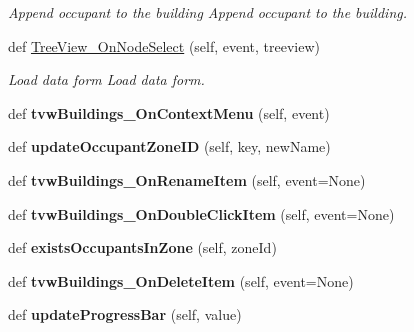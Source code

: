 \begin{DoxyCompactItemize}
\begin{DoxyCompactList}\small\item\em Append occupant to the building Append occupant to the building. \end{DoxyCompactList}\item 
def \hyperlink{class_no_m_a_s_s___g_u_i_1_1_app_a7208f3b1f5b7729d83c63f0eb6f97a8a}{Tree\+View\+\_\+\+On\+Node\+Select} (self, event, treeview)
\begin{DoxyCompactList}\small\item\em Load data form Load data form. \end{DoxyCompactList}\item 
\mbox{\label{class_no_m_a_s_s___g_u_i_1_1_app_aba0b136ce86ac92c6d0b799aba96b33c}} 
def {\bfseries tvw\+Buildings\+\_\+\+On\+Context\+Menu} (self, event)
\item 
\mbox{\label{class_no_m_a_s_s___g_u_i_1_1_app_a77496544a1d16515fa440f237110f52c}} 
def {\bfseries update\+Occupant\+Zone\+ID} (self, key, new\+Name)
\item 
\mbox{\label{class_no_m_a_s_s___g_u_i_1_1_app_a9a2953f5b7ba5bec684640a9b22be158}} 
def {\bfseries tvw\+Buildings\+\_\+\+On\+Rename\+Item} (self, event=None)
\item 
\mbox{\label{class_no_m_a_s_s___g_u_i_1_1_app_ab20860aefaad3146737f66ea2c27723b}} 
def {\bfseries tvw\+Buildings\+\_\+\+On\+Double\+Click\+Item} (self, event=None)
\item 
\mbox{\label{class_no_m_a_s_s___g_u_i_1_1_app_ad17bb4938e69d3f03282ddcddba19cd9}} 
def {\bfseries exists\+Occupants\+In\+Zone} (self, zone\+Id)
\item 
\mbox{\label{class_no_m_a_s_s___g_u_i_1_1_app_aac1950256fe7d98a71a25f758167854b}} 
def {\bfseries tvw\+Buildings\+\_\+\+On\+Delete\+Item} (self, event=None)
\item 
\mbox{\label{class_no_m_a_s_s___g_u_i_1_1_app_a37b9cfb8fc4f8241721c512880d8a546}} 
def {\bfseries update\+Progress\+Bar} (self, value)
\item 

\end{DoxyCompactItemize}
